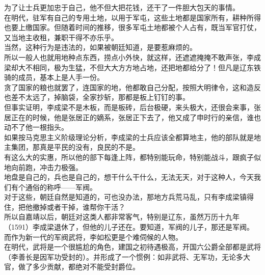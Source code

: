 \begin{multicols}{\theparacolNo}
为了让士兵更加忠于自己，他不但大把花钱，还干了一件胆大包天的事情。\\

在明代，驻军有自己的专用土地，以用于军屯，这些土地都是国家所有，耕种所得也要上缴国家。但随着时间的推移，很多军屯土地都被个人占有，既当军官打仗，又当地主收租，兼职干得不亦乐乎。\\

当然，这种行为是违法的，如果被朝廷知道，是要惹麻烦的。\\

所以一般人也就用地种点东西，捞点小外快，就这样，还遮遮掩掩不敢声张，李成梁却大不相同，极为生猛，不但大大方方地占地，还把地都给分了！但凡是辽东铁骑的成员，基本上是人手一份。\\

贪了国家的粮也就罢了，连国家的地，他都敢自己分配，按照大明律令，这和造反也差不太远了，掉脑袋，全家抄斩，那都是板上钉钉的事。\\

但事实证明，李成梁不是木板，而是板砖，后台极硬，来头极大，还很会来事，张居正在的时候，他是张居正的嫡系，张居正下去了，他又成了申时行的亲信，谁也动不了他一根指头。\\

如果按马克思主义阶级理论分析，李成梁的士兵应该全都算地主，他的部队就是地主集团，那真是平民的没有，良民的不是。\\

有这么大的实惠，所以他的部下每逢上阵，都特别能玩命，特别能战斗，跟疯子似地向前跑，冲击力极强。\\

地盘是自己的，兵也是自己的，想干什么干什么，无法无天，对于这种人，今天我们有个通俗的称呼——军阀。\\

对于这些，朝廷自然是知道的，可也没办法，那地方兵荒马乱，只有李成梁镇得住，把他撤掉或者干掉，谁帮你干活？\\

所以自嘉靖以后，朝廷对这类人都非常客气，特别是辽东，虽然万历十九年（1591）李成梁退休了，但他的儿子还在。要知道，军阀的儿子，那还是军阀。\\

而作为新一代的军阀武将，李如松更是个难伺候的人物。\\

在明代，武将是一个很尴尬的角色，建国之初待遇极高，开国六公爵全部都是武将（李善长是因军功受封的）。并形成了一个惯例：如非武将、无军功，无论多大官，做了多少贡献，都绝对不能受封爵位。\\


\end{multicols}

